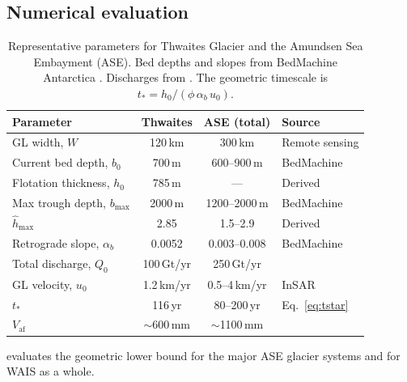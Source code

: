 \documentclass[11pt]{article}
\newcommand{\hhat}{\hat{h}}
\newcommand{\Vaf}{V_{\mathrm{af}}}
\begin{document}
\subsection{Numerical evaluation}

\begin{table}[ht]
\centering
\caption{Representative parameters for Thwaites Glacier and the Amundsen Sea Embayment (ASE). Bed depths and slopes from BedMachine Antarctica \citep{Morlighem2020}. Discharges from \citet{Rignot2019}. The geometric timescale is $t_* = h_0/(\phi\,\alpha_b\,u_0)$.}
\label{tab:parameters}
\smallskip
\begin{tabular}{l c c l}
\toprule
Parameter & Thwaites & ASE (total) & Source \\
\midrule
GL width, $W$ & 120\,km & 300\,km & Remote sensing \\
Current bed depth, $b_0$ & 700\,m & 600--900\,m & BedMachine \\
Flotation thickness, $h_0$ & 785\,m & --- & Derived \\
Max trough depth, $b_{\max}$ & 2000\,m & 1200--2000\,m & BedMachine \\
$\hhat_{\max}$ & 2.85 & 1.5--2.9 & Derived \\
Retrograde slope, $\alpha_b$ & 0.0052 & 0.003--0.008 & BedMachine \\
Total discharge, $Q_0$ & 100\,Gt/yr & 250\,Gt/yr & \citet{Rignot2019} \\
GL velocity, $u_0$ & 1.2\,km/yr & 0.5--4\,km/yr & InSAR \\
$t_*$ & 116\,yr & 80--200\,yr & Eq.~\eqref{eq:tstar} \\
$\Vaf$ & $\sim$600\,mm & $\sim$1100\,mm & \citet{Morlighem2020} \\
\bottomrule
\end{tabular}
\end{table}

 evaluates the geometric lower bound for the major ASE glacier systems and for WAIS as a whole.
\end{document}
